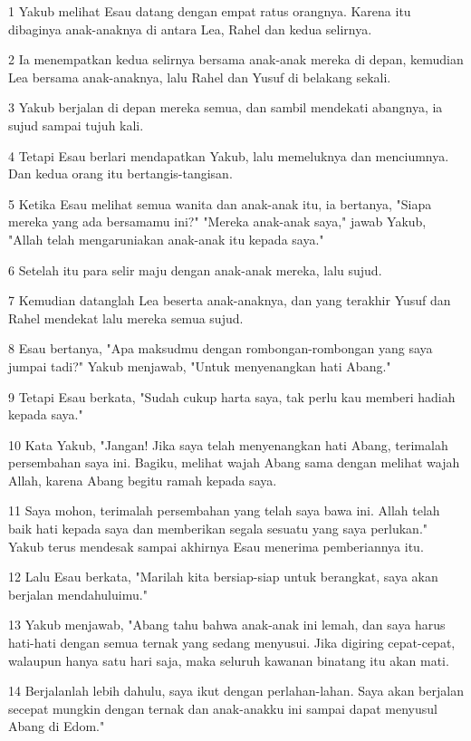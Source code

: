 \par 1 Yakub melihat Esau datang dengan empat ratus orangnya. Karena itu dibaginya anak-anaknya di antara Lea, Rahel dan kedua selirnya.
\par 2 Ia menempatkan kedua selirnya bersama anak-anak mereka di depan, kemudian Lea bersama anak-anaknya, lalu Rahel dan Yusuf di belakang sekali.
\par 3 Yakub berjalan di depan mereka semua, dan sambil mendekati abangnya, ia sujud sampai tujuh kali.
\par 4 Tetapi Esau berlari mendapatkan Yakub, lalu memeluknya dan menciumnya. Dan kedua orang itu bertangis-tangisan.
\par 5 Ketika Esau melihat semua wanita dan anak-anak itu, ia bertanya, "Siapa mereka yang ada bersamamu ini?" "Mereka anak-anak saya," jawab Yakub, "Allah telah mengaruniakan anak-anak itu kepada saya."
\par 6 Setelah itu para selir maju dengan anak-anak mereka, lalu sujud.
\par 7 Kemudian datanglah Lea beserta anak-anaknya, dan yang terakhir Yusuf dan Rahel mendekat lalu mereka semua sujud.
\par 8 Esau bertanya, "Apa maksudmu dengan rombongan-rombongan yang saya jumpai tadi?" Yakub menjawab, "Untuk menyenangkan hati Abang."
\par 9 Tetapi Esau berkata, "Sudah cukup harta saya, tak perlu kau memberi hadiah kepada saya."
\par 10 Kata Yakub, "Jangan! Jika saya telah menyenangkan hati Abang, terimalah persembahan saya ini. Bagiku, melihat wajah Abang sama dengan melihat wajah Allah, karena Abang begitu ramah kepada saya.
\par 11 Saya mohon, terimalah persembahan yang telah saya bawa ini. Allah telah baik hati kepada saya dan memberikan segala sesuatu yang saya perlukan." Yakub terus mendesak sampai akhirnya Esau menerima pemberiannya itu.
\par 12 Lalu Esau berkata, "Marilah kita bersiap-siap untuk berangkat, saya akan berjalan mendahuluimu."
\par 13 Yakub menjawab, "Abang tahu bahwa anak-anak ini lemah, dan saya harus hati-hati dengan semua ternak yang sedang menyusui. Jika digiring cepat-cepat, walaupun hanya satu hari saja, maka seluruh kawanan binatang itu akan mati.
\par 14 Berjalanlah lebih dahulu, saya ikut dengan perlahan-lahan. Saya akan berjalan secepat mungkin dengan ternak dan anak-anakku ini sampai dapat menyusul Abang di Edom."
